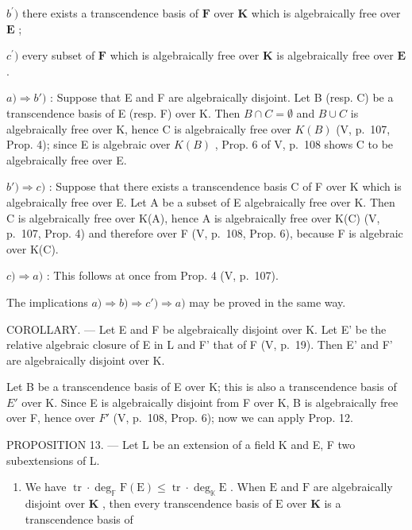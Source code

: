 \(b^{\prime})\) there exists a transcendence basis of \(\mathbf{F}\) over \(\mathbf{K}\) which is algebraically free over \(\mathbf{E}\) ;

\(c^{\prime})\) every subset of \(\mathbf{F}\) which is algebraically free over \(\mathbf{K}\) is algebraically free over \(\mathbf{E}\) .

\(a) \Rightarrow b')\) : Suppose that E and F are algebraically disjoint. Let B (resp. C) be a transcendence basis of E (resp. F) over K. Then \(B \cap C = \emptyset\) and \(B \cup C\) is algebraically free over K, hence C is algebraically free over \(K(B)\) (V, p.~107, Prop. 4); since E is algebraic over \(K(B)\) , Prop. 6 of V, p.~108 shows C to be algebraically free over E.

\(b') \Rightarrow c)\) : Suppose that there exists a transcendence basis C of F over K which is algebraically free over E. Let A be a subset of E algebraically free over K. Then C is algebraically free over K(A), hence A is algebraically free over K(C) (V, p.~107, Prop. 4) and therefore over F (V, p.~108, Prop. 6), because F is algebraic over K(C).

\(c) \Rightarrow a)\) : This follows at once from Prop. 4 (V, p.~107).

The implications \(a) \Rightarrow b) \Rightarrow c') \Rightarrow a)\) may be proved in the same way.

COROLLARY. --- Let E and F be algebraically disjoint over K. Let E' be the relative algebraic closure of E in L and F' that of F (V, p.~19). Then E' and F' are algebraically disjoint over K.

Let B be a transcendence basis of E over K; this is also a transcendence basis of \(E'\) over K. Since E is algebraically disjoint from F over K, B is algebraically free over F, hence over \(F'\) (V, p.~108, Prop. 6); now we can apply Prop. 12.

PROPOSITION 13. --- Let L be an extension of a field K and E, F two subextensions of L.

\begin{enumerate}
\def\labelenumi{\alph{enumi})}
\tightlist
\item
  We have \(\operatorname{tr} \cdot \deg_{\mathbb{F}} \mathrm{F}(\mathrm{E}) \leqslant \operatorname{tr} \cdot \deg_{\mathbb{K}} \mathrm{E}\) . When \(\mathrm{E}\) and \(\mathrm{F}\) are algebraically disjoint over \(\mathbf{K}\) , then every transcendence basis of \(\mathrm{E}\) over \(\mathbf{K}\) is a transcendence basis of
\end{enumerate}

